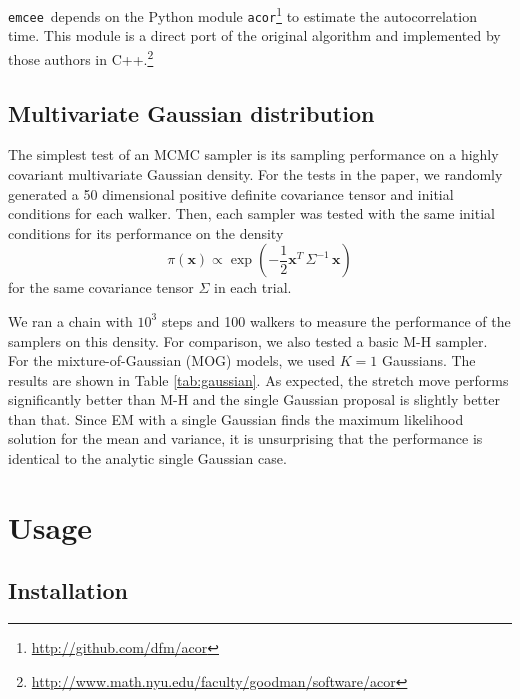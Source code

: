 \documentclass[12pt,preprint]{aastex}
\newcommand{\project}[1]{\texttt{#1}}
\newcommand{\thisplain}{emcee}
\newcommand{\this}{\project{\thisplain}}
\newcommand{\tab}[1]{Table \ref{tab:#1}}
\begin{document}
\this~depends on the Python module
\project{acor}\footnote{\url{http://github.com/dfm/acor}} to estimate the
autocorrelation time. This module is a direct port of the original
algorithm \citep[described by][]{Goodman:2010} and implemented by those
authors in
C++.\footnote{\url{http://www.math.nyu.edu/faculty/goodman/software/acor}}

\subsection{Multivariate Gaussian distribution}

The simplest test of an MCMC sampler is its sampling performance on a highly covariant
multivariate Gaussian density. For the tests in the paper, we randomly generated
a 50 dimensional positive definite covariance tensor and initial conditions for each
walker.  Then, each sampler was tested with the same initial conditions for its
performance on the density
\begin{equation}
    \pi (\mathbf{x}) \propto \exp\left ( -\frac{1}{2} \mathbf{x}^T \, \Sigma^{-1} \, \mathbf{x} \right )
\end{equation}
for the same covariance tensor $\Sigma$ in each trial.

We ran a chain with $10^3$ steps and 100 walkers to measure the performance of the
samplers on this density. For comparison, we also tested a basic M-H sampler. For
the mixture-of-Gaussian (MOG) models, we used $K = 1$ Gaussians. The
results are shown in \tab{gaussian}. As expected, the stretch move performs
significantly better than M-H and the single Gaussian proposal is slightly better
than that. Since EM with a single Gaussian finds the maximum likelihood solution
for the mean and variance, it is unsurprising that the performance is identical
to the analytic single Gaussian case.

\section{Usage}

\subsection{Installation}
\end{document}
